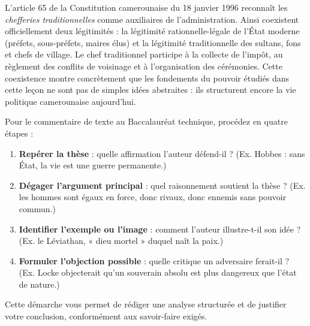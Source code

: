 \documentclass[11pt]{article}
\begin{document}
\begin{savaistu}
L'article 65 de la Constitution camerounaise du 18 janvier 1996 reconnaît les \emph{chefferies traditionnelles} comme auxiliaires de l'administration. Ainsi coexistent officiellement deux légitimités : la légitimité rationnelle-légale de l'État moderne (préfets, sous-préfets, maires élus) et la légitimité traditionnelle des sultans, fons et chefs de village. Le chef traditionnel participe à la collecte de l'impôt, au règlement des conflits de voisinage et à l'organisation des cérémonies. Cette coexistence montre concrètement que les fondements du pouvoir étudiés dans cette leçon ne sont pas de simples idées abstraites : ils structurent encore la vie politique camerounaise aujourd'hui.
\end{savaistu}

\begin{methode}
Pour le commentaire de texte au Baccalauréat technique, procédez en quatre étapes :
\begin{enumerate}
\item \textbf{Repérer la thèse} : quelle affirmation l'auteur défend-il ? (Ex. Hobbes : sans État, la vie est une guerre permanente.)
\item \textbf{Dégager l'argument principal} : quel raisonnement soutient la thèse ? (Ex. les hommes sont égaux en force, donc rivaux, donc ennemis sans pouvoir commun.)
\item \textbf{Identifier l'exemple ou l'image} : comment l'auteur illustre-t-il son idée ? (Ex. le Léviathan, « dieu mortel » duquel naît la paix.)
\item \textbf{Formuler l'objection possible} : quelle critique un adversaire ferait-il ? (Ex. Locke objecterait qu'un souverain absolu est plus dangereux que l'état de nature.)
\end{enumerate}
Cette démarche vous permet de rédiger une analyse structurée et de justifier votre conclusion, conformément aux savoir-faire exigés.
\end{methode}
\end{document}
